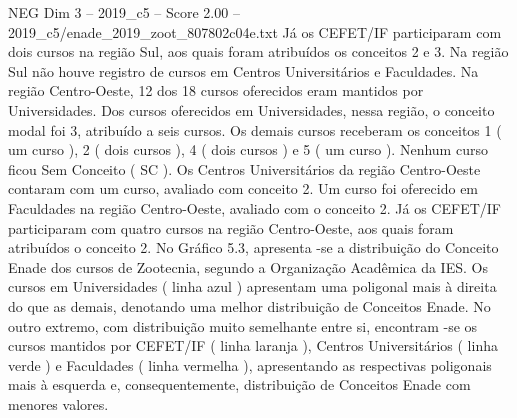 \begin{textsample}{NEG Dim 3 – 2019\_c5 – Score 2.00 – 2019\_c5/enade\_2019\_zoot\_807802c04e.txt}
Já os CEFET/IF participaram com dois cursos na região Sul, aos quais foram atribuídos os conceitos 2 e 3.
Na região Sul não houve registro de cursos em Centros Universitários e Faculdades.
Na região Centro-Oeste, 12 dos 18 cursos oferecidos eram mantidos por Universidades.
Dos cursos oferecidos em Universidades, nessa região, o conceito modal foi 3, atribuído a seis cursos.
Os demais cursos receberam os conceitos 1 ( um curso ), 2 ( dois cursos ), 4 ( dois cursos ) e 5 ( um curso ).
Nenhum curso ficou Sem Conceito ( SC ).
Os Centros Universitários da região Centro-Oeste contaram com um curso, avaliado com conceito 2.
Um curso foi oferecido em Faculdades na região Centro-Oeste, avaliado com o conceito 2.
Já os CEFET/IF participaram com quatro cursos na região Centro-Oeste, aos quais foram atribuídos o conceito 2.
No Gráfico 5.3, apresenta -se a distribuição do Conceito Enade dos cursos de Zootecnia, segundo a Organização Acadêmica da IES.
Os cursos em Universidades ( linha azul ) apresentam uma poligonal mais à direita do que as demais, denotando uma melhor distribuição de Conceitos Enade.
No outro extremo, com distribuição muito semelhante entre si, encontram -se os cursos mantidos por CEFET/IF ( linha laranja ), Centros Universitários ( linha verde ) e Faculdades ( linha vermelha ), apresentando as respectivas poligonais mais à esquerda e, consequentemente, distribuição de Conceitos Enade com menores valores.

\end{textsample}
